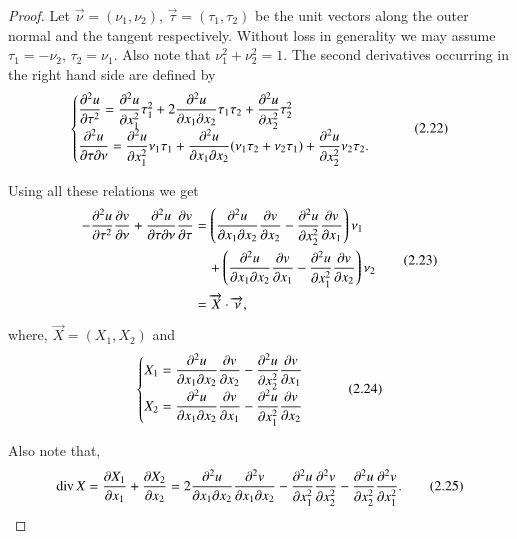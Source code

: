 \begin{proof}
Let $\overrightarrow{\nu}=(\nu_{1},\nu_{2})$,
$\overrightarrow{\tau}=(\tau_{1},\tau_{2})$ be the unit vectors along
the outer normal and the tangent respectively. Without loss in
generality we may assume $\tau_{1}=-\nu_{2}$, $\tau_{2}=\nu_{1}$. Also
note that $\nu^{2}_{1}+\nu^{2}_{2}=1$. The second derivatives occurring
in the right hand side are defined by
\begin{equation*}
\begin{cases}
\dfrac{\partial^{2}u}{\partial \tau^{2}}=\dfrac{\partial^{2}u}{\partial
  x^{2}_{1}}\tau^{2}_{1}+2\dfrac{\partial^{2}u}{\partial x_{1}\partial
  x_{2}}\tau_{1}\tau_{2}+\dfrac{\partial^{2}u}{\partial
  x^{2}_{2}}\tau^{2}_{2}\\[4pt]
\dfrac{\partial^{2}u}{\partial \tau \partial \nu}=\dfrac{\partial^{2}u}{\partial
  x^{2}_{1}}\nu_{1}\tau_{1}+\dfrac{\partial^{2}u}{\partial x_{1}\partial
  x_{2}}(\nu_{1}\tau_{2}+\nu_{2}\tau_{1})+\dfrac{\partial^{2}u}{\partial
  x^{2}_{2}}\nu_{2}\tau_{2}. 
\end{cases}\tag{2.22}\label{chap2-eq2.22}
\end{equation*}

Using all these relations we get
\begin{equation*}
\begin{split}
-\frac{\partial^{2}u}{\partial\tau^{2}}\frac{\partial v}{\partial \nu}+\frac{\partial^{2}u}{\partial
  \tau\partial \nu}\frac{\partial v}{\partial \tau} &= \left(\frac{\partial^{2}u}{\partial x_{1}\partial
  x_{2}}\frac{\partial v}{\partial x_{2}}-\frac{\partial^{2}u}{\partial x^{2}_{2}}\frac{\partial
  v}{\partial x_{1}}\right)\nu_{1}\\
&\quad +\left(\frac{\partial^{2}u}{\partial x_{1}\partial x_{2}}\frac{\partial v}{\partial
  x_{1}}-\frac{\partial^{2}u}{\partial x^{2}_{1}}\frac{\partial v}{\partial
  x_{2}}\right)\nu_{2}\\ 
&= \overrightarrow{X}\cdot \overrightarrow{\nu},
\end{split}\tag{2.23}\label{chap2-eq2.23}
\end{equation*}
where, $\overrightarrow{X}=(X_{1},X_{2})$ and
\begin{equation*}
\begin{cases}
X_{1}=\dfrac{\partial^{2}u}{\partial x_{1}\partial x_{2}}\dfrac{\partial v}{\partial
  x_{2}}-\dfrac{\partial^{2}u}{\partial x^{2}_{2}}\dfrac{\partial v}{\partial x_{1}}\\
X_{2}=\dfrac{\partial^{2}u}{\partial x_{1}\partial x_{2}}\dfrac{\partial v}{\partial
  x_{1}}-\dfrac{\partial^{2}u}{\partial x^{2}_{1}}\dfrac{\partial v}{\partial x_{2}}
\end{cases}\tag{2.24}\label{chap2-eq2.24}
\end{equation*}

Also note that,
\begin{equation*}
\text{div\,} X=\frac{\partial X_{1}}{\partial x_{1}}+\frac{\partial X_{2}}{\partial
  x_{2}}=2\frac{\partial^{2}u}{\partial x_{1}\partial x_{2}}\frac{\partial^{2}v}{\partial x_{1}\partial
  x_{2}}-\frac{\partial^{2} u}{\partial x^{2}_{1}}\frac{\partial^{2}v}{\partial
  x^{2}_{2}}-\frac{\partial^{2}u}{\partial x^{2}_{2}}\frac{\partial^{2}v}{\partial
  x^{2}_{1}}.\tag{2.25}\label{chap2-eq2.25}
\end{equation*}\pageoriginale


\end{proof}
